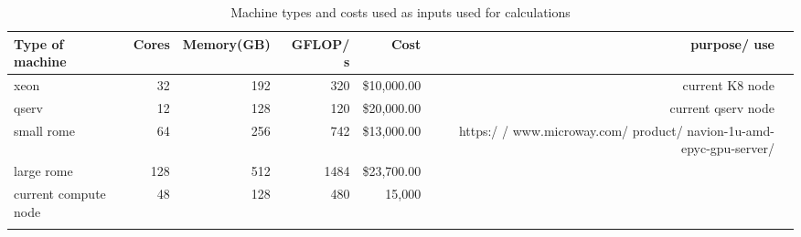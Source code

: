 \tiny \begin{longtable} { |p{}  |r  |r  |r  |r  |r  |r |} 
\caption{Machine types and costs used as inputs used for calculations \label{tab:Machines}}\\ 
\hline 
{Type of machine }&{Cores}&{Memory(GB)}&{GFLOP/ s}&{Cost}&{purpose/ use } \\ \hline
{xeon }&{32}&{192}&{320}&{\$10,000.00}&{current K8 node } \\ \hline
{qserv }&{12}&{128}&{120}&{\$20,000.00}&{current qserv node } \\ \hline
{small rome  }&{64}&{256}&{742}&{\$13,000.00}&{https:/ / www.microway.com/ product/ navion-1u-amd-epyc-gpu-server/ } \\ \hline
{large rome }&{128}&{512}&{1484}&{\$23,700.00}& \\ \hline
{current compute node }&{48}&{128}&{480}&{15,000}&{} \\ \hline
{}&{}&{}&{}&{}&{} \\ \hline
\end{longtable} \normalsize
